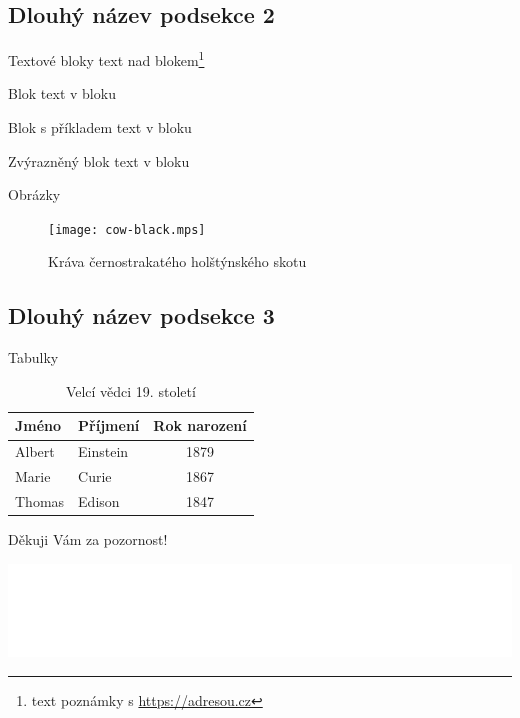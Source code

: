 \documentclass[
]{beamer}
\begin{document}
\subsection[Název podsekce 2]{Dlouhý název podsekce 2}

\begin{frame}{Textové bloky}
text nad blokem\footnote{text poznámky s \url{https://adresou.cz}}
\begin{block}{Blok}
  text v bloku
\end{block}
\begin{exampleblock}{Blok s příkladem}
  text v bloku
\end{exampleblock}
\begin{alertblock}{Zvýrazněný blok}
  text v bloku
\end{alertblock}
\end{frame}

\begin{frame}{Obrázky}
\begin{figure}
  \texttt{[image: cow-black.mps]}
  \caption{Kráva černostrakatého holštýnského skotu}
\end{figure}
\end{frame}

\subsection[Název podsekce 3]{Dlouhý název podsekce 3}

\begin{frame}{Tabulky}
\begin{table}
  \begin{tabular}{llc}
    Jméno & Příjmení & Rok narození \\ \midrule
    Albert & Einstein & 1879 \\
    Marie & Curie & 1867 \\
    Thomas & Edison & 1847 \\
  \end{tabular}
  \caption{Velcí vědci 19. století}
\end{table}
\end{frame}

\begin{frame}[plain]
\vfill
\centerline{Děkuji Vám za pozornost!}
\vfill\vfill
\end{frame}

\begingroup
{}
\begin{frame}[plain]
\vfill
\centering
\includegraphics[width=\textwidth]{institution}
\vfill
\end{frame}
\endgroup
\end{document}
